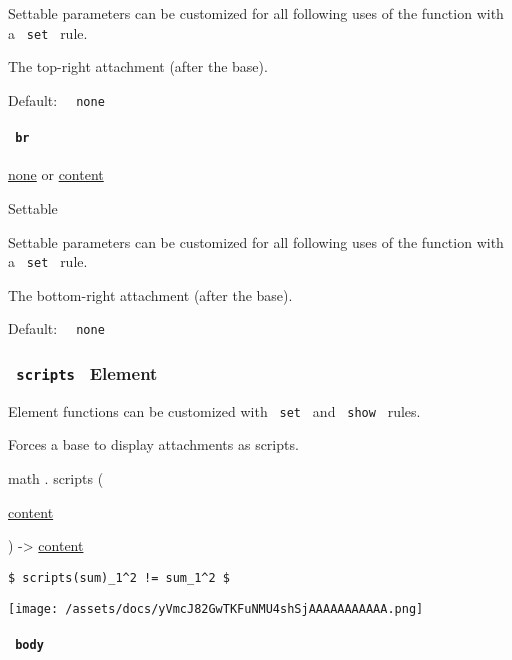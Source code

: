 \label{functions-attach-tr-settable-tooltip}
Settable parameters can be customized for all following uses of the
function with a \texttt{\ set\ } rule.

The top-right attachment (after the base).

Default: \texttt{\ }{\texttt{\ none\ }}\texttt{\ }

\paragraph{\texorpdfstring{\texttt{\ br\ }}{ br }}\label{functions-attach-br}

\href{/docs/reference/foundations/none/}{none} {or}
\href{/docs/reference/foundations/content/}{content}

{{ Settable }}

\label{functions-attach-br-settable-tooltip}
Settable parameters can be customized for all following uses of the
function with a \texttt{\ set\ } rule.

The bottom-right attachment (after the base).

Default: \texttt{\ }{\texttt{\ none\ }}\texttt{\ }

\subsubsection{\texorpdfstring{\texttt{\ scripts\ } {{ Element
}}}{ scripts   Element }}\label{functions-scripts}

\label{functions-scripts-element-tooltip}
Element functions can be customized with \texttt{\ set\ } and
\texttt{\ show\ } rules.

Forces a base to display attachments as scripts.

math { . } { scripts } (

{ \href{/docs/reference/foundations/content/}{content} }

) -\textgreater{} \href{/docs/reference/foundations/content/}{content}

\begin{verbatim}
$ scripts(sum)_1^2 != sum_1^2 $
\end{verbatim}

\texttt{[image: /assets/docs/yVmcJ82GwTKFuNMU4shSjAAAAAAAAAAA.png]}

\paragraph{\texorpdfstring{\texttt{\ body\ }}{ body }}\label{functions-scripts-body}

